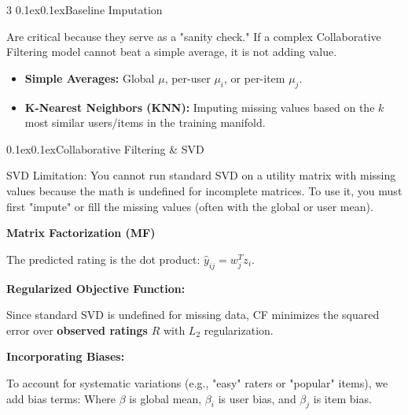 \documentclass[8pt,landscape]{article}
\makeatletter
\renewcommand{\section}{\@startsection{section}{2}{0pt}%
    {0.1ex}{0.1ex}{\fontsize{8}{9}\bfseries\color{red}}}
\renewcommand{\subsection}{\@startsection{subsection}{2}{0pt}%
    {0.1ex}{0.1ex}{\fontsize{7}{8}\bfseries\color{blue}}}
\newcommand{\smalltext}[1]{{\fontsize{7}{8}\selectfont\sloppy #1\par}}
\makeatother
\begin{document}
\begin{multicols}{3}
\subsection{Baseline Imputation}
\smalltext{
Are critical because they serve as a "sanity check." If a complex Collaborative Filtering model cannot beat a simple average, it is not adding value.
\begin{itemize}
    \item \textbf{Simple Averages:} Global $\mu$, per-user $\mu_i$, or per-item $\mu_j$.
    \item \textbf{K-Nearest Neighbors (KNN):} Imputing missing values based on the $k$ most similar users/items in the training manifold.
\end{itemize}
}

\section{Collaborative Filtering \& SVD}
\smalltext{
   SVD Limitation: You cannot run standard SVD on a utility matrix with missing values because the math is undefined for incomplete matrices. To use it, you must first "impute" or fill the missing values (often with the global or user mean).
}
\textbf{Matrix Factorization (MF)}
\smalltext{
The predicted rating is the dot product: $\hat{y}_{ij} = w_j^T z_i$.
}
\textbf{Regularized Objective Function:}
\smalltext{
Since standard SVD is undefined for missing data, CF minimizes the squared error over \textbf{observed ratings} $R$ with $L_2$ regularization.
}
\textbf{Incorporating Biases:}
\smalltext{
To account for systematic variations (e.g., "easy" raters or "popular" items), we add bias terms:
Where $\beta$ is global mean, $\beta_i$ is user bias, and $\beta_j$ is item bias.
}

\end{multicols}
\end{document}
